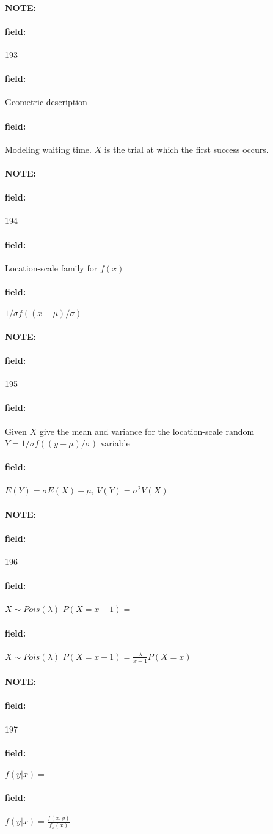 \documentclass[12pt]{article}
\newenvironment{note}{\paragraph{NOTE:}}{}
\newenvironment{field}{\paragraph{field:}}{}
\begin{document}
\begin{note} \begin{field} \tiny 193 \end{field}
  \begin{field}
    Geometric description
  \end{field}
  \begin{field}
    Modeling waiting time. $X$ is the trial at which the first success occurs.
  \end{field}
\end{note}

\begin{note} \begin{field} \tiny 194 \end{field}
  \begin{field}
    Location-scale family for $f(x)$
  \end{field}
  \begin{field}
    $1/\sigma f((x - \mu)/\sigma)$
  \end{field}
\end{note}

\begin{note} \begin{field} \tiny 195 \end{field}
  \begin{field}
    Given $X$ give the mean and variance for the location-scale random $Y= 1/\sigma f((y - \mu)/\sigma)$ variable
  \end{field}
  \begin{field}
    $E(Y) = \sigma E(X) + \mu$, $V(Y) = \sigma^2 V(X)$
  \end{field}
\end{note}


\begin{note} \begin{field} \tiny 196 \end{field}
  \begin{field}
    $X \sim Pois(\lambda)$ $P(X = x+1) = $
  \end{field}
  \begin{field}
    $X \sim Pois(\lambda)$ $P(X = x+1) = \frac{\lambda}{x + 1}P(X = x)$
  \end{field}
\end{note}


\begin{note} \begin{field} \tiny 197 \end{field}
  \begin{field}
    $f(y|x) = $
  \end{field}
  \begin{field}
    $f(y|x) = \frac{f(x,y)}{f_x(x)}$
  \end{field}
\end{note}
\end{document}
